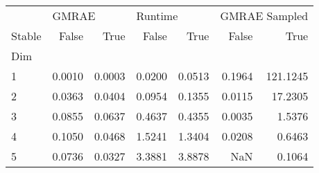 \begin{tabular}{lrrrrrr}
\toprule
{} & \multicolumn{2}{l}{GMRAE} & \multicolumn{2}{l}{Runtime} & \multicolumn{2}{l}{GMRAE Sampled} \\
Stable &  False &  True  &   False &  True  &         False &    True  \\
Dim &        &        &         &        &               &          \\
\midrule
1   & 0.0010 & 0.0003 &  0.0200 & 0.0513 &        0.1964 & 121.1245 \\
2   & 0.0363 & 0.0404 &  0.0954 & 0.1355 &        0.0115 &  17.2305 \\
3   & 0.0855 & 0.0637 &  0.4637 & 0.4355 &        0.0035 &   1.5376 \\
4   & 0.1050 & 0.0468 &  1.5241 & 1.3404 &        0.0208 &   0.6463 \\
5   & 0.0736 & 0.0327 &  3.3881 & 3.8878 &           NaN &   0.1064 \\
\bottomrule
\end{tabular}
